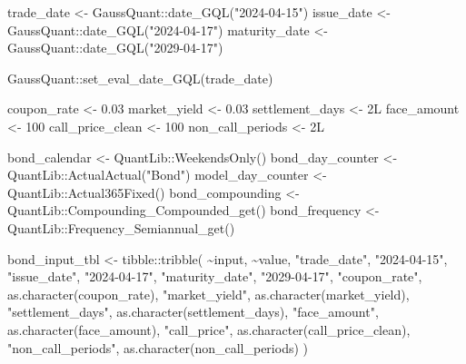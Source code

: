 \documentclass[
  letterpaper,
  DIV=11,
  numbers=noendperiod]{scrreprt}
\newenvironment{Shaded}{\begin{snugshade}}{\end{snugshade}}
\newcommand{\DecValTok}[1]{\textcolor[rgb]{0.68,0.00,0.00}{#1}}
\newcommand{\FloatTok}[1]{\textcolor[rgb]{0.68,0.00,0.00}{#1}}
\newcommand{\FunctionTok}[1]{\textcolor[rgb]{0.28,0.35,0.67}{#1}}
\newcommand{\NormalTok}[1]{\textcolor[rgb]{0.00,0.23,0.31}{#1}}
\newcommand{\OtherTok}[1]{\textcolor[rgb]{0.00,0.23,0.31}{#1}}
\newcommand{\SpecialCharTok}[1]{\textcolor[rgb]{0.37,0.37,0.37}{#1}}
\newcommand{\StringTok}[1]{\textcolor[rgb]{0.13,0.47,0.30}{#1}}
\begin{document}
\begin{Shaded}
\begin{Highlighting}[]
\NormalTok{trade\_date }\OtherTok{\textless{}{-}}\NormalTok{ GaussQuant}\SpecialCharTok{::}\FunctionTok{date\_GQL}\NormalTok{(}\StringTok{"2024{-}04{-}15"}\NormalTok{)}
\NormalTok{issue\_date }\OtherTok{\textless{}{-}}\NormalTok{ GaussQuant}\SpecialCharTok{::}\FunctionTok{date\_GQL}\NormalTok{(}\StringTok{"2024{-}04{-}17"}\NormalTok{)}
\NormalTok{maturity\_date }\OtherTok{\textless{}{-}}\NormalTok{ GaussQuant}\SpecialCharTok{::}\FunctionTok{date\_GQL}\NormalTok{(}\StringTok{"2029{-}04{-}17"}\NormalTok{)}

\NormalTok{GaussQuant}\SpecialCharTok{::}\FunctionTok{set\_eval\_date\_GQL}\NormalTok{(trade\_date)}

\NormalTok{coupon\_rate }\OtherTok{\textless{}{-}} \FloatTok{0.03}
\NormalTok{market\_yield }\OtherTok{\textless{}{-}} \FloatTok{0.03}
\NormalTok{settlement\_days }\OtherTok{\textless{}{-}} \DecValTok{2}\NormalTok{L}
\NormalTok{face\_amount }\OtherTok{\textless{}{-}} \DecValTok{100}
\NormalTok{call\_price\_clean }\OtherTok{\textless{}{-}} \DecValTok{100}
\NormalTok{non\_call\_periods }\OtherTok{\textless{}{-}} \DecValTok{2}\NormalTok{L}

\NormalTok{bond\_calendar }\OtherTok{\textless{}{-}}\NormalTok{ QuantLib}\SpecialCharTok{::}\FunctionTok{WeekendsOnly}\NormalTok{()}
\NormalTok{bond\_day\_counter }\OtherTok{\textless{}{-}}\NormalTok{ QuantLib}\SpecialCharTok{::}\FunctionTok{ActualActual}\NormalTok{(}\StringTok{"Bond"}\NormalTok{)}
\NormalTok{model\_day\_counter }\OtherTok{\textless{}{-}}\NormalTok{ QuantLib}\SpecialCharTok{::}\FunctionTok{Actual365Fixed}\NormalTok{()}
\NormalTok{bond\_compounding }\OtherTok{\textless{}{-}}\NormalTok{ QuantLib}\SpecialCharTok{::}\FunctionTok{Compounding\_Compounded\_get}\NormalTok{()}
\NormalTok{bond\_frequency }\OtherTok{\textless{}{-}}\NormalTok{ QuantLib}\SpecialCharTok{::}\FunctionTok{Frequency\_Semiannual\_get}\NormalTok{()}

\NormalTok{bond\_input\_tbl }\OtherTok{\textless{}{-}}\NormalTok{ tibble}\SpecialCharTok{::}\FunctionTok{tribble}\NormalTok{(}
  \SpecialCharTok{\textasciitilde{}}\NormalTok{input,             }\SpecialCharTok{\textasciitilde{}}\NormalTok{value,}
  \StringTok{"trade\_date"}\NormalTok{,        }\StringTok{"2024{-}04{-}15"}\NormalTok{,}
  \StringTok{"issue\_date"}\NormalTok{,        }\StringTok{"2024{-}04{-}17"}\NormalTok{,}
  \StringTok{"maturity\_date"}\NormalTok{,     }\StringTok{"2029{-}04{-}17"}\NormalTok{,}
  \StringTok{"coupon\_rate"}\NormalTok{,        }\FunctionTok{as.character}\NormalTok{(coupon\_rate),}
  \StringTok{"market\_yield"}\NormalTok{,       }\FunctionTok{as.character}\NormalTok{(market\_yield),}
  \StringTok{"settlement\_days"}\NormalTok{,    }\FunctionTok{as.character}\NormalTok{(settlement\_days),}
  \StringTok{"face\_amount"}\NormalTok{,        }\FunctionTok{as.character}\NormalTok{(face\_amount),}
  \StringTok{"call\_price"}\NormalTok{,         }\FunctionTok{as.character}\NormalTok{(call\_price\_clean),}
  \StringTok{"non\_call\_periods"}\NormalTok{,   }\FunctionTok{as.character}\NormalTok{(non\_call\_periods)}
\NormalTok{)}


\end{Highlighting}
\end{Shaded}
\end{document}
